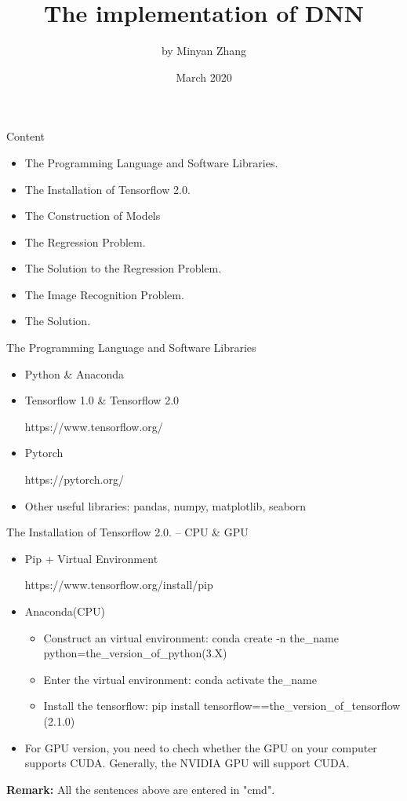 \documentclass{beamer}
\title{The implementation of DNN}
\author{by Minyan Zhang}
\date{March 2020}
\begin{document}
\maketitle
\begin{frame}{Content}
\begin{itemize}
\item The Programming Language and Software Libraries.
\item The Installation of Tensorflow 2.0.
\item The Construction of Models
\item The Regression Problem.
\item The Solution to the Regression Problem.
\item The Image Recognition Problem.
\item The Solution.
\end{itemize}
\end{frame}

\begin{frame}{The Programming Language and Software Libraries}
\begin{itemize}
    \item Python \& Anaconda
    \item Tensorflow 1.0 \& Tensorflow 2.0

    https://www.tensorflow.org/
    \item Pytorch

    https://pytorch.org/
    \item Other useful libraries: pandas, numpy, matplotlib, seaborn
\end{itemize}
\end{frame}

\begin{frame}{The Installation of Tensorflow 2.0. -- CPU \& GPU}
   \begin{itemize}
     \item Pip + Virtual Environment

     https://www.tensorflow.org/install/pip
     \item Anaconda(CPU)

     \begin{itemize}
        \item Construct an virtual environment: {\color{blue} conda create -n the\_name python=the\_version\_of\_python(3.X)}
        \item Enter the virtual environment: {\color{blue} conda activate the\_name}
        \item Install the tensorflow: {\color{blue} pip install tensorflow==the\_version\_of\_tensorflow (2.1.0)}
     \end{itemize}
     
     \item For GPU version, you need to chech whether the GPU on your computer supports CUDA. Generally, the NVIDIA GPU will support CUDA.
   \end{itemize}
 \begin{flushleft}
 \textbf{Remark:} All the sentences above are entered in "cmd".
 \end{flushleft}
\end{frame}
\end{document}
